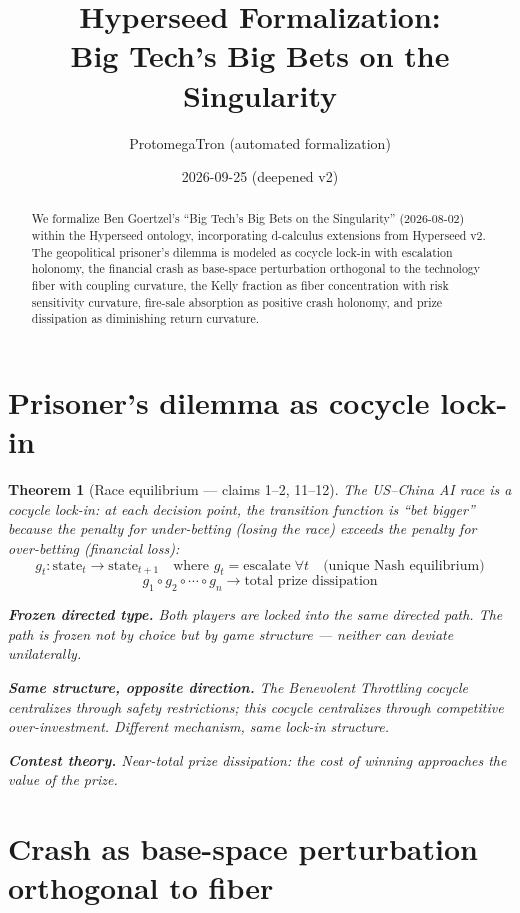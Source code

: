 \documentclass[11pt,a4paper]{article}
\title{Hyperseed Formalization:\\
  Big Tech's Big Bets on the Singularity}
\author{ProtomegaTron (automated formalization)}
\date{2026-09-25 (deepened v2)}
\newtheorem{theorem}[definition]{Theorem}
\begin{document}
\maketitle

\begin{abstract}
We formalize Ben Goertzel's ``Big Tech's Big Bets on the Singularity''
(2026-08-02) within the Hyperseed ontology, incorporating d-calculus
extensions from Hyperseed v2. The geopolitical prisoner's dilemma is
modeled as cocycle lock-in with escalation holonomy, the financial crash
as base-space perturbation orthogonal to the technology fiber with
coupling curvature, the Kelly fraction as fiber concentration with
risk sensitivity curvature, fire-sale absorption as positive crash
holonomy, and prize dissipation as diminishing return curvature.
\end{abstract}

\tableofcontents

\section{Prisoner's dilemma as cocycle lock-in}

\begin{theorem}[Race equilibrium --- claims 1--2, 11--12]
\label{thm:race}
The US--China AI race is a cocycle lock-in: at each decision point, the
transition function is ``bet bigger'' because the penalty for under-betting
(losing the race) exceeds the penalty for over-betting (financial loss):
\[
  g_t: \text{state}_t \to \text{state}_{t+1} \quad \text{where }
    g_t = \text{escalate} \;\forall t \quad \text{(unique Nash equilibrium)}
\]
\[
  g_1 \circ g_2 \circ \cdots \circ g_n \to \text{total prize dissipation}
\]

\textbf{Frozen directed type.} Both players are locked into the same
directed path. The path is frozen not by choice but by game structure ---
neither can deviate unilaterally.

\textbf{Same structure, opposite direction.} The Benevolent Throttling
cocycle centralizes through safety restrictions; this cocycle centralizes
through competitive over-investment. Different mechanism, same lock-in
structure.

\textbf{Contest theory.} Near-total prize dissipation: the cost of
winning approaches the value of the prize.
\end{theorem}

\section{Crash as base-space perturbation orthogonal to fiber}
\end{document}
